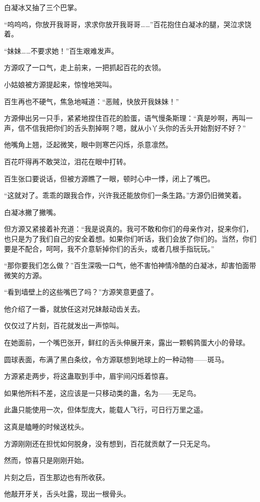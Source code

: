 \begin{this_body}
白凝冰又抽了三个巴掌。

“呜呜呜，你放开我哥哥，求求你放开我哥哥……”百花抱住白凝冰的腿，哭泣求饶着。

“妹妹……不要求她！”百生艰难发声。

方源叹了一口气，走上前来，一把抓起百花的衣领。

小姑娘被方源提起来，惊惶地哭叫。

百生再也不硬气，焦急地喊道：“恶贼，快放开我妹妹！”

方源伸出另一只手，紧紧地捏住百花的脸蛋，语气慢条斯理：“真是吵啊，再叫一声，信不信我把你们的舌头割掉啊？嗯，就从小丫头你的舌头开始割好不好？”

他嘴角上翘，泛起微笑，眼中则寒芒闪烁，杀意凛然。

百花吓得再不敢哭泣，泪花在眼中打转。

百生张口要说话，但被方源瞧了一眼，顿时心中一悸，闭上了嘴巴。

“这就对了。乖乖的跟我合作，兴许我还能放你们一条生路。”方源仍旧微笑着。

白凝冰撇了撇嘴。

但方源又紧接着补充道：“我是说真的。我可不敢和你们的母亲作对，捉来你们，也只是为了我们自己的安全着想。如果你们听话，我们会放了你们的。当然，你们要是不配合，呵呵，我不介意斩掉你们的舌头，或者几根手指玩玩。”

“那你要我们怎么做？”百生深吸一口气，他不害怕神情冷酷的白凝冰，却害怕面带微笑的方源。

“看到墙壁上的这些嘴巴了吗？”方源笑意更盛了。

他介绍了一番，就放任这对兄妹敲动齿关去。

仅仅过了片刻，百花就发出一声惊叫。

在她面前，一个嘴巴张开，鲜红的舌头伸展开来，露出一颗鹌鹑蛋大小的骨球。

圆球表面，布满了黑白条纹，令方源联想到地球上的一种动物——斑马。

方源紧走两步，将这蛊取到手中，眉宇间闪烁着惊喜。

如果他所料不差，这应该是一只移动类的蛊，名为——无足鸟。

此蛊只能使用一次，但体型庞大，能载人飞行，可日行万里之遥。

这真是瞌睡的时候送枕头。

方源刚刚还在担忧如何脱身，没有想到，百花就贡献了一只无足鸟。

然而，惊喜只是刚刚开始。

片刻之后，百生那边也有所收获。

他敲开牙关，舌头吐露，现出一根骨头。


\end{this_body}
